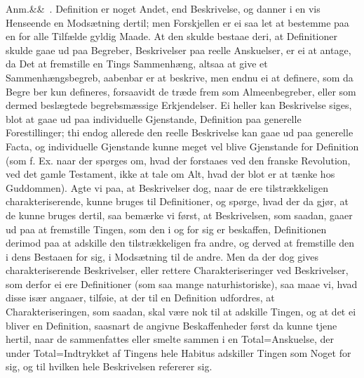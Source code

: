 \documentclass[12pt]{book}
\def\sperr#1{#1}%
\def\textit#1{#1}%
\newcommand{\sperr}[1]{\textls[180]{#1}}
\newcommand{\anm}[1]{%
  \par\vspace{0.5\baselineskip}%
  \noindent\hspace{\parindent}\sperr{Anm.}\ifx&#1&\else~\textit{#1}.\fi
  \enspace\ignorespaces
}
\newcommand{\opage}[1]{\marginnote{\footnotesize\textit{[#1]}}}
\begin{document}
\anm{} Definition er noget Andet, end Beskrivelse, og danner i en vis Henseende
en Modsætning dertil; men Forskjellen er ei saa let at bestemme paa en for alle
Tilfælde gyldig Maade. At den skulde bestaae deri, at Definitioner skulde gaae
ud paa Begreber, Beskrivelser paa reelle Anskuelser, er ei at antage, da Det at
fremstille en Tings Sammenhæng, altsaa at give et Sammenhængsbegreb, aabenbar
er at beskrive, men endnu ei at definere, som da Begre%
\opage{369}%
ber kun defineres, forsaavidt de træde frem som Almeenbegreber, eller som
dermed beslægtede begrebsmæssige Erkjendelser. Ei heller kan Beskrivelse siges,
blot at gaae ud paa individuelle Gjenstande, Definition paa generelle
Forestillinger; thi endog allerede den reelle Beskrivelse kan gaae ud paa
generelle Facta, og individuelle Gjenstande kunne meget vel blive Gjenstande
for Definition (som f. Ex. naar der spørges om, hvad der forstaaes ved den
franske Revolution, ved det gamle Testament, ikke at tale om Alt, hvad der blot
er at tænke hos Guddommen). Agte vi paa, at Beskrivelser dog, naar de ere
tilstrækkeligen charakteriserende, kunne bruges til Definitioner, og spørge,
hvad der da gjør, at de kunne bruges dertil, saa bemærke vi først, at
Beskrivelsen, som saadan, gaaer ud paa at fremstille Tingen, som den i og for
sig er beskaffen, Definitionen derimod paa at adskille den tilstrækkeligen fra
andre, og derved at fremstille den i dens Bestaaen for sig, i Modsætning til de
andre. Men da der dog gives charakteriserende Beskrivelser, eller rettere
Charakteriseringer ved Beskrivelser, som derfor ei ere Definitioner (som saa
mange naturhistoriske), saa maae vi, hvad disse især angaaer, tilføie, at der
til en Definition udfordres, at Charakteriseringen, som saadan, skal være nok
til at adskille Tingen, og at det ei bliver en Definition, saasnart de angivne
Beskaffenheder først da kunne tjene hertil, naar de sammenfattes eller
\opage{370} %
smelte sammen i en Total=Anskuelse, der under Total=Indtrykket af Tingens hele
Habitus adskiller Tingen som Noget for sig, og til hvilken hele Beskrivelsen
refererer sig.
\end{document}

